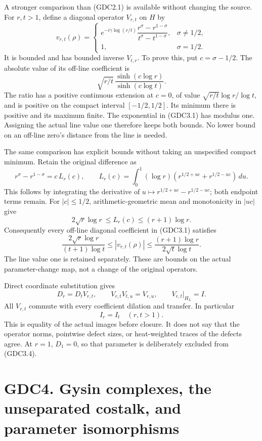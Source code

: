 A stronger comparison than (GDC2.1) is available without changing the
source. For \(r,t>1\), define a diagonal operator \(V_{r,t}\) on \(H\)
by \[
v_{r,t}(\rho)=
\begin{cases}
e^{-i\gamma\log(r/t)}\dfrac{r^\sigma-r^{1-\sigma}}{t^\sigma-t^{1-\sigma}},&\sigma\ne1/2,\\
1,&\sigma=1/2.
\end{cases}
\tag{GDC3.1}
\] It is bounded and has bounded inverse \(V_{t,r}\). To prove this, put
\(c=\sigma-1/2\). The absolute value of its off-line coefficient is \[
\sqrt{r/t}\,\frac{\sinh(c\log r)}{\sinh(c\log t)}.
\tag{GDC3.2}
\] The ratio has a positive continuous extension at \(c=0\), of value
\(\sqrt{r/t}\log r/\log t\), and is positive on the compact interval
\([-1/2,1/2]\). Its minimum there is positive and its maximum finite.
The exponential in (GDC3.1) has modulus one. Assigning the actual line
value one therefore keeps both bounds. No lower bound on an off-line
zero's distance from the line is needed.

The same comparison has explicit bounds without taking an unspecified
compact minimum. Retain the original difference as \[
r^\sigma-r^{1-\sigma}=c\,L_r(c),\qquad
L_r(c)=\int_0^1(\log r)
\left(r^{1/2+uc}+r^{1/2-uc}\right)\,du.
\] This follows by integrating the derivative of
\(u\mapsto r^{1/2+uc}-r^{1/2-uc}\); both endpoint terms remain. For
\(|c|\le1/2\), arithmetic-geometric mean and monotonicity in \(|uc|\)
give \[
2\sqrt r\log r\ \le L_r(c)\le(r+1)\log r.
\] Consequently every off-line diagonal coefficient in (GDC3.1)
satisfies \[
\frac{2\sqrt r\log r}{(t+1)\log t}
\le |v_{r,t}(\rho)|
\le \frac{(r+1)\log r}{2\sqrt t\log t}.
\tag{GDC3.2a}
\] The line value one is retained separately. These are bounds on the
actual parameter-change map, not a change of the original operators.

Direct coordinate substitution gives \[
D_r=D_tV_{r,t},\qquad V_{r,t}V_{t,u}=V_{r,u},\qquad
V_{r,t}|_{H_L}=I.
\tag{GDC3.3}
\] All \(V_{r,t}\) commute with every coefficient dilation and transfer.
In particular \[
\boxed{I_r=I_t\quad(r,t>1).}
\tag{GDC3.4}
\] This is equality of the actual images before closure. It does not say
that the operator norms, pointwise defect sizes, or heat-weighted traces
of the defects agree. At \(r=1\), \(D_1=0\), so that parameter is
deliberately excluded from (GDC3.4).

\section{GDC4. Gysin complexes, the unseparated costalk, and parameter
isomorphisms}\label{gdc4.-gysin-complexes-the-unseparated-costalk-and-parameter-isomorphisms}

